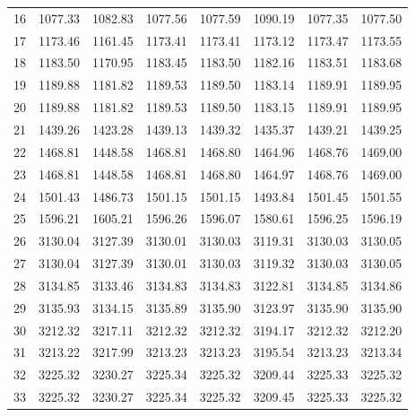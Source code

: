 \documentclass[10pt,oneside]{article}
\begin{document}
\begin{table}[h!]
\begin{tabular}{cccccccc}
16 &   1077.33 & 1082.83 & 1077.56 & 1077.59 &      1090.19 & 1077.35 & 1077.50 \\
17 &   1173.46 & 1161.45 & 1173.41 & 1173.41 &      1173.12 & 1173.47 & 1173.55 \\
18 &   1183.50 & 1170.95 & 1183.45 & 1183.50 &      1182.16 & 1183.51 & 1183.68 \\
19 &   1189.88 & 1181.82 & 1189.53 & 1189.50 &      1183.14 & 1189.91 & 1189.95 \\
20 &   1189.88 & 1181.82 & 1189.53 & 1189.50 &      1183.15 & 1189.91 & 1189.95 \\
21 &   1439.26 & 1423.28 & 1439.13 & 1439.32 &      1435.37 & 1439.21 & 1439.25 \\
22 &   1468.81 & 1448.58 & 1468.81 & 1468.80 &      1464.96 & 1468.76 & 1469.00 \\
23 &   1468.81 & 1448.58 & 1468.81 & 1468.80 &      1464.97 & 1468.76 & 1469.00 \\
24 &   1501.43 & 1486.73 & 1501.15 & 1501.15 &      1493.84 & 1501.45 & 1501.55 \\
25 &   1596.21 & 1605.21 & 1596.26 & 1596.07 &      1580.61 & 1596.25 & 1596.19 \\
26 &   3130.04 & 3127.39 & 3130.01 & 3130.03 &      3119.31 & 3130.03 & 3130.05 \\
27 &   3130.04 & 3127.39 & 3130.01 & 3130.03 &      3119.32 & 3130.03 & 3130.05 \\
28 &   3134.85 & 3133.46 & 3134.83 & 3134.83 &      3122.81 & 3134.85 & 3134.86 \\
29 &   3135.93 & 3134.15 & 3135.89 & 3135.90 &      3123.97 & 3135.90 & 3135.90 \\
30 &   3212.32 & 3217.11 & 3212.32 & 3212.32 &      3194.17 & 3212.32 & 3212.20 \\
31 &   3213.22 & 3217.99 & 3213.23 & 3213.23 &      3195.54 & 3213.23 & 3213.34 \\
32 &   3225.32 & 3230.27 & 3225.34 & 3225.32 &      3209.44 & 3225.33 & 3225.32 \\
33 &   3225.32 & 3230.27 & 3225.34 & 3225.32 &      3209.45 & 3225.33 & 3225.32 \\
\bottomrule
\end{tabular}
\end{table}

\clearpage
\end{document}
